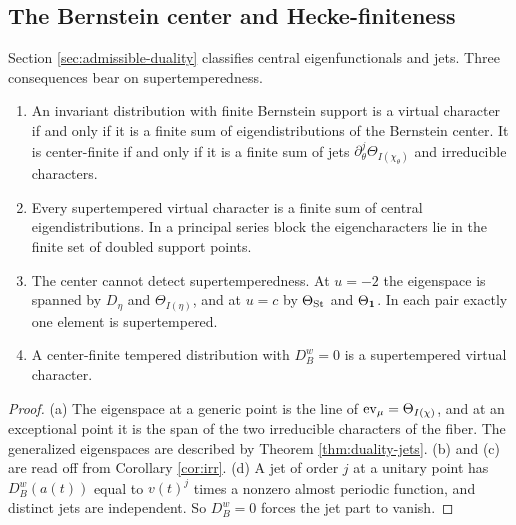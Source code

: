 \subsection{The Bernstein center and Hecke-finiteness}\label{sub:center}
Section \ref{sec:admissible-duality} classifies central eigenfunctionals and jets. Three consequences bear on supertemperedness.

\begin{proposition}\label{prop:center}\begin{enumerate}[label=(\alph*),leftmargin=*]
\item An invariant distribution with finite Bernstein support is a virtual character if and only if it is a finite sum of eigendistributions of the Bernstein center. It is center-finite if and only if it is a finite sum of jets $\partial_\theta^j\Theta_{I(\chi_\theta)}$ and irreducible characters.
\item Every supertempered virtual character is a finite sum of central eigendistributions. In a principal series block the eigencharacters lie in the finite set of doubled support points.
\item The center cannot detect supertemperedness. At $u=-2$ the eigenspace is spanned by $D_\eta$ and $\Theta_{I(\eta)}$, and at $u=c$ by $\Theta_{\operatorname{St}}$ and $\Theta_{\mathbf 1}$. In each pair exactly one element is supertempered.
\item A center-finite tempered distribution with $D^w_B=0$ is a supertempered virtual character.
\end{enumerate}
\end{proposition}
\begin{proof}
(a) The eigenspace at a generic point is the line of $\operatorname{ev}_\mu=\Theta_{I(\chi)}$, and at an exceptional point it is the span of the two irreducible characters of the fiber. The generalized eigenspaces are described by Theorem \ref{thm:duality-jets}. (b) and (c) are read off from Corollary \ref{cor:irr}. (d) A jet of order $j$ at a unitary point has $D^w_B(a(t))$ equal to $v(t)^j$ times a nonzero almost periodic function, and distinct jets are independent. So $D^w_B=0$ forces the jet part to vanish.
\end{proof}

